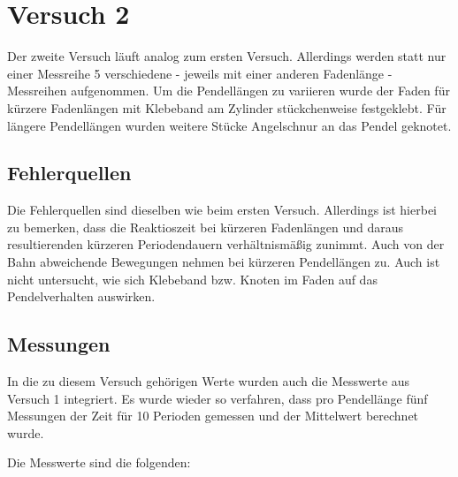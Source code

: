 \documentclass[
  9pt,
]{article}
\begin{document}
\newpage

\hypertarget{versuch-2}{%
\section{Versuch 2}\label{versuch-2}}

Der zweite Versuch läuft analog zum ersten Versuch. Allerdings werden
statt nur einer Messreihe 5 verschiedene - jeweils mit einer anderen
Fadenlänge - Messreihen aufgenommen. Um die Pendellängen zu variieren
wurde der Faden für kürzere Fadenlängen mit Klebeband am Zylinder
stückchenweise festgeklebt. Für längere Pendellängen wurden weitere
Stücke Angelschnur an das Pendel geknotet.

\hypertarget{fehlerquellen-1}{%
\subsection{Fehlerquellen}\label{fehlerquellen-1}}

Die Fehlerquellen sind dieselben wie beim ersten Versuch. Allerdings ist
hierbei zu bemerken, dass die Reaktioszeit bei kürzeren Fadenlängen und
daraus resultierenden kürzeren Periodendauern verhältnismäßig zunimmt.
Auch von der Bahn abweichende Bewegungen nehmen bei kürzeren
Pendellängen zu. Auch ist nicht untersucht, wie sich Klebeband bzw.
Knoten im Faden auf das Pendelverhalten auswirken.

\hypertarget{messungen-1}{%
\subsection{Messungen}\label{messungen-1}}

In die zu diesem Versuch gehörigen Werte wurden auch die Messwerte aus
Versuch 1 integriert. Es wurde wieder so verfahren, dass pro Pendellänge
fünf Messungen der Zeit für 10 Perioden gemessen und der Mittelwert
berechnet wurde.

Die Messwerte sind die folgenden:
\end{document}
